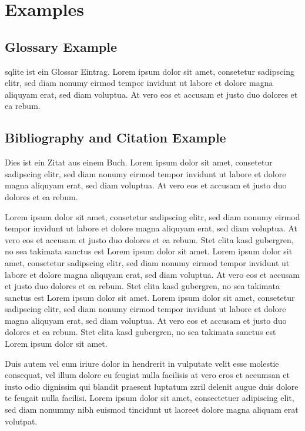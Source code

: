 \chapter*{Examples}

\section*{Glossary Example}

\gls{sqlite} ist ein Glossar Eintrag. Lorem ipsum dolor sit amet, consetetur sadipscing elitr, sed diam nonumy eirmod tempor invidunt ut labore et dolore magna aliquyam erat, sed diam voluptua. At vero eos et accusam et justo duo dolores et ea rebum.

\section*{Bibliography and Citation Example}

Dies ist ein Zitat aus einem Buch\cite{Matthews201111}. Lorem ipsum dolor sit amet, consetetur sadipscing elitr, sed diam nonumy eirmod tempor invidunt ut labore et dolore magna aliquyam erat, sed diam voluptua. At vero eos et accusam et justo duo dolores et ea rebum.

Lorem ipsum dolor sit amet, consetetur sadipscing elitr, sed diam nonumy eirmod tempor invidunt ut labore et dolore magna aliquyam erat, sed diam voluptua. At vero eos et accusam et justo duo dolores et ea rebum. Stet clita kasd gubergren, no sea takimata sanctus est Lorem ipsum dolor sit amet. Lorem ipsum dolor sit amet, consetetur sadipscing elitr, sed diam nonumy eirmod tempor invidunt ut labore et dolore magna aliquyam erat, sed diam voluptua. At vero eos et accusam et justo duo dolores et ea rebum. Stet clita kasd gubergren, no sea takimata sanctus est Lorem ipsum dolor sit amet. Lorem ipsum dolor sit amet, consetetur sadipscing elitr, sed diam nonumy eirmod tempor invidunt ut labore et dolore magna aliquyam erat, sed diam voluptua. At vero eos et accusam et justo duo dolores et ea rebum. Stet clita kasd gubergren, no sea takimata sanctus est Lorem ipsum dolor sit amet. 

Duis autem vel eum iriure dolor in hendrerit in vulputate velit esse molestie consequat, vel illum dolore eu feugiat nulla facilisis at vero eros et accumsan et iusto odio dignissim qui blandit praesent luptatum zzril delenit augue duis dolore te feugait nulla facilisi. Lorem ipsum dolor sit amet, consectetuer adipiscing elit, sed diam nonummy nibh euismod tincidunt ut laoreet dolore magna aliquam erat volutpat. 


